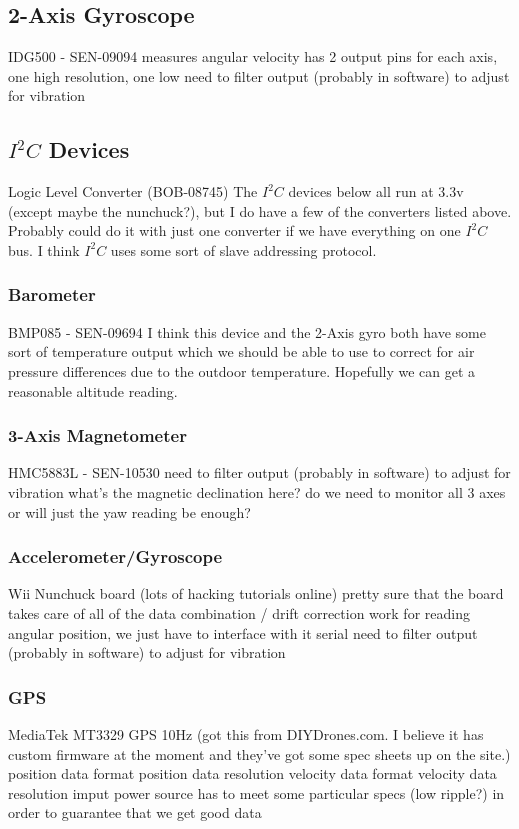 \documentclass{article}
\begin{document}
\subsection{2-Axis Gyroscope}
IDG500 - SEN-09094
measures angular velocity
has 2 output pins for each axis, one high resolution, one low
need to filter output (probably in software) to adjust for vibration


\subsection{$I^2C$ Devices}
Logic Level Converter (BOB-08745)
The $I^2C$ devices below all run at 3.3v (except maybe the nunchuck?), but I do have a few of the 
converters listed above.  Probably could do it with just one converter if we have everything on one $I^2C$ bus.  I think $I^2C$ uses some sort of slave addressing protocol.

\subsubsection{Barometer}
BMP085 - SEN-09694
I think this device and the 2-Axis gyro both have some sort of temperature output which we should be able to use to correct for air pressure differences due to the outdoor temperature.  Hopefully we can get a reasonable altitude reading.

\subsubsection{3-Axis Magnetometer}
HMC5883L - SEN-10530
need to filter output (probably in software) to adjust for vibration
what's the magnetic declination here?
do we need to monitor all 3 axes or will just the yaw reading be enough?

\subsubsection{Accelerometer/Gyroscope}
Wii Nunchuck board (lots of hacking tutorials online)
pretty sure that the board takes care of all of the data combination / drift correction work for reading angular position, we just have to interface with it serial
need to filter output (probably in software) to adjust for vibration

\subsubsection{GPS}
MediaTek MT3329 GPS 10Hz (got this from DIYDrones.com.  I believe it has custom firmware at the moment and they've got some spec sheets up on the site.)
position data format
position data resolution
velocity data format
velocity data resolution
imput power source has to meet some particular specs (low ripple?) in order to guarantee that we get good data
\end{document}
